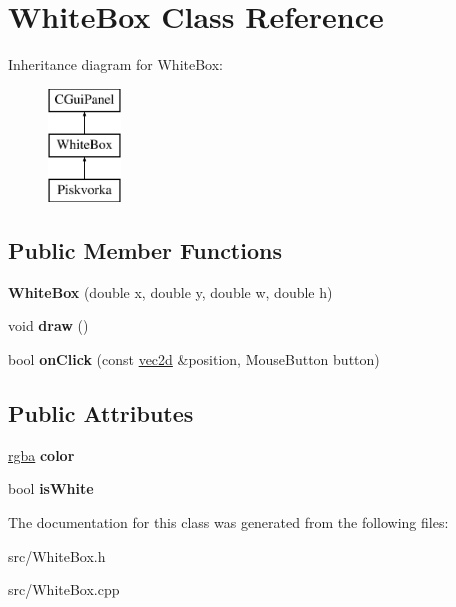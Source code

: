 \hypertarget{class_white_box}{
\section{WhiteBox Class Reference}
\label{class_white_box}
}
Inheritance diagram for WhiteBox:\begin{figure}[H]
\begin{center}
\leavevmode
\includegraphics[height=3.000000cm]{class_white_box}
\end{center}
\end{figure}
\subsection*{Public Member Functions}
\begin{DoxyCompactItemize}
\item 
\hypertarget{class_white_box_a01a05b1ae0a0227853a25335a954a8b1}{
{\bfseries WhiteBox} (double x, double y, double w, double h)}
\label{class_white_box_a01a05b1ae0a0227853a25335a954a8b1}

\item 
\hypertarget{class_white_box_a9a94fd76db8e966603ed2a7ede4173f8}{
void {\bfseries draw} ()}
\label{class_white_box_a9a94fd76db8e966603ed2a7ede4173f8}

\item 
\hypertarget{class_white_box_ae582c8cc991d496c834fba16d3ed7385}{
bool {\bfseries onClick} (const \hyperlink{classvec2d}{vec2d} \&position, MouseButton button)}
\label{class_white_box_ae582c8cc991d496c834fba16d3ed7385}

\end{DoxyCompactItemize}
\subsection*{Public Attributes}
\begin{DoxyCompactItemize}
\item 
\hypertarget{class_white_box_a48cbf215391d283595500e9b5f87f556}{
\hyperlink{classrgba}{rgba} {\bfseries color}}
\label{class_white_box_a48cbf215391d283595500e9b5f87f556}

\item 
\hypertarget{class_white_box_a8df6f666921b4f8e0c20e87df6546b35}{
bool {\bfseries isWhite}}
\label{class_white_box_a8df6f666921b4f8e0c20e87df6546b35}

\end{DoxyCompactItemize}


The documentation for this class was generated from the following files:\begin{DoxyCompactItemize}
\item 
src/WhiteBox.h\item 
src/WhiteBox.cpp\end{DoxyCompactItemize}
